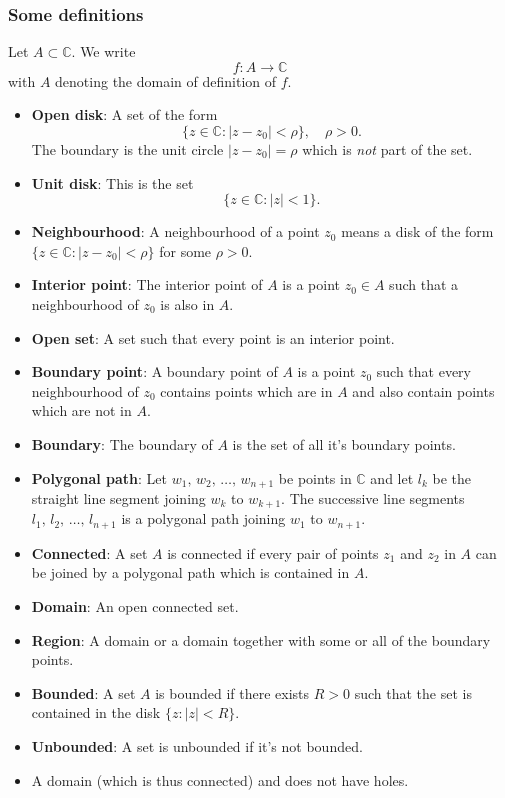 \documentclass{article}
\begin{document}
\subsubsection{Some definitions}
Let $A\subset\mathbb{C}$. We write
\begin{equation}
    f:A\to\mathbb{C} \nonumber
\end{equation}
with $A$ denoting the domain of definition of $f$.
\begin{itemize}
    \item \textbf{Open disk}: A set of the form
    \begin{equation}
        \{ z\in\mathbb{C}:\vert z-z_0\vert<\rho \},\quad \rho>0.
    \end{equation}
    The boundary is the unit circle $\vert z-z_0\vert=\rho$ which is \textit{not} part of the set.
    \item \textbf{Unit disk}: This is the set
    \begin{equation}
        \{ z\in\mathbb{C}:\vert z\vert<1 \}.
    \end{equation}
    \item \textbf{Neighbourhood}: A neighbourhood of a point $z_0$ means a disk of the form $ \{ z\in\mathbb{C}:\vert z-z_0\vert<\rho \} $ for some $\rho>0$.
    \item \textbf{Interior point}: The interior point of $A$ is a point $z_0\in A$ such that a neighbourhood of $z_0$ is also in $A$.
    \item \textbf{Open set}: A set such that every point is an interior point.
    \item \textbf{Boundary point}: A boundary point of $A$ is a point $z_0$ such that every neighbourhood of $z_0$ contains points which are in $A$ and also contain points which are not in $A$.
    \item \textbf{Boundary}: The boundary of $A$ is the set of all it's boundary points.
    \item \textbf{Polygonal path}: Let $w_1,\,w_2,\,\ldots,\,w_{n+1}$ be points in $\mathbb{C}$ and let $l_k$ be the straight line segment joining $w_k$ to $w_{k+1}$. The successive line segments $l_1,\,l_2,\,\ldots,\,l_{n+1}$ is a polygonal path joining $w_1$ to $w_{n+1}$.
    \item \textbf{Connected}: A set $A$ is connected if every pair of points $z_1$ and $z_2$ in $A$ can be joined by a polygonal path which is contained in $A$.
    \item \textbf{Domain}: An open connected set.
    \item \textbf{Region}: A domain or a domain together with some or all of the boundary points.
    \item \textbf{Bounded}: A set $A$ is bounded if there exists $R>0$ such that the set is contained in the disk $\{ z:\vert z\vert<R \}$.
    \item \textbf{Unbounded}: A set is unbounded if it's not bounded.
    \item A domain (which is thus connected) and does not have holes.
\end{itemize}
\end{document}
